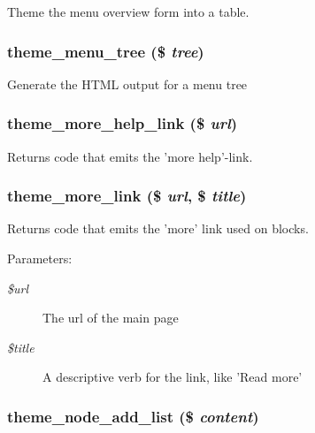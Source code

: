 Theme the menu overview form into a table. \hypertarget{group__themeable_g88e49eaff39c8953c4ac72f4d2752ab1}{
\subsubsection[{theme\_\-menu\_\-tree}]{\setlength{\rightskip}{0pt plus 5cm}theme\_\-menu\_\-tree (\$ {\em tree})}}
\label{group__themeable_g88e49eaff39c8953c4ac72f4d2752ab1}


Generate the HTML output for a menu tree \hypertarget{group__themeable_ga0b3233e46dcfc24ecab60b769c6caab}{
\subsubsection[{theme\_\-more\_\-help\_\-link}]{\setlength{\rightskip}{0pt plus 5cm}theme\_\-more\_\-help\_\-link (\$ {\em url})}}
\label{group__themeable_ga0b3233e46dcfc24ecab60b769c6caab}


Returns code that emits the 'more help'-link. \hypertarget{group__themeable_ge54d44857d9145119af69cd97018278f}{
\subsubsection[{theme\_\-more\_\-link}]{\setlength{\rightskip}{0pt plus 5cm}theme\_\-more\_\-link (\$ {\em url}, \/  \$ {\em title})}}
\label{group__themeable_ge54d44857d9145119af69cd97018278f}


Returns code that emits the 'more' link used on blocks.

\begin{Desc}
\item[Parameters:]
\begin{description}
\item[{\em \$url}]The url of the main page \item[{\em \$title}]A descriptive verb for the link, like 'Read more' \end{description}
\end{Desc}
\hypertarget{group__themeable_g8eb0074d64a1c80291b651316f9b0659}{
\subsubsection[{theme\_\-node\_\-add\_\-list}]{\setlength{\rightskip}{0pt plus 5cm}theme\_\-node\_\-add\_\-list (\$ {\em content})}}
\label{group__themeable_g8eb0074d64a1c80291b651316f9b0659}


